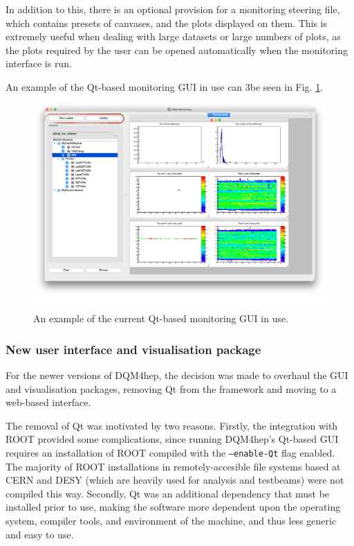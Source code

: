In addition to this, there is an optional provision for a monitoring steering file, which contains presets of canvases, and the plots displayed on them. This is extremely useful when dealing with large datasets or large numbers of plots, as the plots required by the user can be opened automatically when the monitoring interface is run.

An example of the Qt-based monitoring \acrshort{GUI} in use can 3be seen in Fig. \ref{figure:daq/dqm4hep/old-gui}. 

\begin{figure}[h]
	\centering
	\includegraphics[width=1.0\textwidth]{../Pictures/DQM4hepMonitoringGui.png}
	\caption{An example of the current Qt-based monitoring \acrshort{GUI} in use.}
	\label{figure:daq/dqm4hep/old-gui}
\end{figure}

\subsubsection{New user interface and visualisation package}
For the newer versions of \acrshort{DQM4hep}, the decision was made to overhaul the \acrshort{GUI} and visualisation packages, removing Qt from the framework and moving to a web-based interface.

The removal of Qt was motivated by two reasons. Firstly, the integration with ROOT provided some complications, since running \acrshort{DQM4hep}'s Qt-based \acrshort{GUI} requires an installation of ROOT compiled with the \texttt{--enable-Qt} flag enabled. The majority of ROOT installations in remotely-accesible file systems based at \acrshort{CERN} and \acrshort{DESY} (which are heavily used for analysis and testbeams) were not compiled this way. Secondly, Qt was an additional dependency that must be installed prior to use, making the software more dependent upon the operating system, compiler tools, and environment of the machine, and thus less generic and easy to use. %

